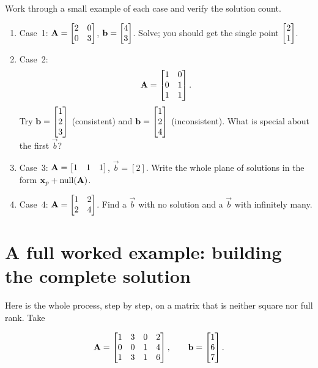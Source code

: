 \begin{labbox}
Work through a small example of each case and verify the solution count.
\begin{enumerate}
  \item Case~1: $\mathbf{A}=\begin{bmatrix}2&0\\0&3\end{bmatrix}$, $\mathbf{b}=\begin{bmatrix}4\\3\end{bmatrix}$.
    Solve; you should get the single point $\begin{bmatrix}2\\1\end{bmatrix}$.
  \item Case~2: \[\mathbf{A}=\begin{bmatrix}1&0\\0&1\\1&1\end{bmatrix}.\] Try
    $\mathbf{b}=\begin{bmatrix}1\\2\\3\end{bmatrix}$ (consistent) and $\mathbf{b}=\begin{bmatrix}1\\2\\4\end{bmatrix}$ (inconsistent).
    What is special about the first $\vec b$?
  \item Case~3: $\mathbf{A}=\begin{bmatrix}1&1&1\end{bmatrix}$, $\vec{b}=[2]$. Write the whole
    plane of solutions in the form $\mathbf{x}_p+\operatorname{null}(\mathbf{A})$.
  \item Case~4: $\mathbf{A}=\begin{bmatrix}1&2\\2&4\end{bmatrix}$. Find a $\vec b$ with no
    solution and a $\vec b$ with infinitely many.
\end{enumerate}
\end{labbox}

\section{A full worked example: building the complete solution}

Here is the whole process, step by step, on a matrix that is neither square nor full
rank. Take

\[
  \mathbf{A}=\begin{bmatrix}1&3&0&2\\0&0&1&4\\1&3&1&6\end{bmatrix},
  \qquad
  \mathbf{b}=\begin{bmatrix}1\\6\\7\end{bmatrix}.
\]

